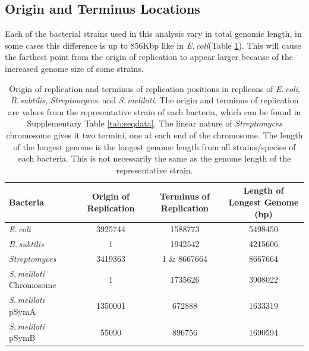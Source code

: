 \documentclass[11pt]{article}
\newcommand{\smel}{\textit{S.\,meliloti}\xspace}
\newcommand{\strep}{\textit{Streptomyces}\xspace}
\newcommand{\ecol}{\textit{E.\,coli}\xspace}
\newcommand{\bass}{\textit{B.\,subtilis}\xspace}
\begin{document}
	\subsection{Origin and Terminus Locations}

Each of the bacterial strains used in this analysis vary in total genomic length, in some cases this difference is up to 856Kbp like in \ecol (Table \ref{tab:oriloc}). 
This will cause the farthest point from the origin of replication to appear larger because of the increased genome size of some strains.


	\begin{table}[H]
		\begin{center}
			\begin{tabular}{lccc}
				\toprule
				Bacteria & Origin of Replication & Terminus of Replication & Length of Longest Genome (bp)\\
				\midrule
				\ecol & 3925744 & 1588773 & 5498450 \\
				\bass & 1 & 1942542 & 4215606\\
				\strep & 3419363 & 1 \& 8667664 & 8667664\\
				\smel Chromosome & 1 & 1735626 & 3908022\\
				\smel pSymA & 1350001 & 672888 & 1633319\\
				\smel pSymB & 55090 & 896756 & 1690594\\
				\bottomrule
			\end{tabular}
			\caption{\label{tab:oriloc} Origin of replication and terminus of replication positions in replicons of \ecol, \bass, \strep, and \smel. The origin and terminus of replication are values from the representative strain of each bacteria, which can be found in Supplementary Table \ref{tab:seqdata}. The linear nature of \strep chromosome gives it two termini, one at each end of the chromosome. The length of the longest genome is the longest genome length from all strains/species of each bacteria. This is not necessarily the same as the genome length of the representative strain.}
		\end{center}
	\end{table}
	
\end{document}
